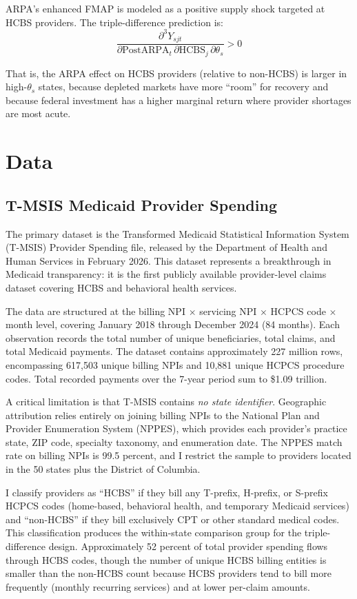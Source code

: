 \documentclass[12pt]{article}
\begin{document}
ARPA's enhanced FMAP is modeled as a positive supply shock targeted at HCBS providers. The triple-difference prediction is:
\begin{equation}
\frac{\partial^3 Y_{sjt}}{\partial \text{PostARPA}_t \, \partial \text{HCBS}_j \, \partial \theta_s} > 0
\end{equation}

That is, the ARPA effect on HCBS providers (relative to non-HCBS) is larger in high-$\theta_s$ states, because depleted markets have more ``room'' for recovery and because federal investment has a higher marginal return where provider shortages are most acute.


\section{Data}

\subsection{T-MSIS Medicaid Provider Spending}

The primary dataset is the Transformed Medicaid Statistical Information System (T-MSIS) Provider Spending file, released by the Department of Health and Human Services in February 2026. This dataset represents a breakthrough in Medicaid transparency: it is the first publicly available provider-level claims dataset covering HCBS and behavioral health services.

The data are structured at the billing NPI $\times$ servicing NPI $\times$ HCPCS code $\times$ month level, covering January 2018 through December 2024 (84 months). Each observation records the total number of unique beneficiaries, total claims, and total Medicaid payments. The dataset contains approximately 227 million rows, encompassing 617,503 unique billing NPIs and 10,881 unique HCPCS procedure codes. Total recorded payments over the 7-year period sum to \$1.09 trillion.

A critical limitation is that T-MSIS contains \emph{no state identifier}. Geographic attribution relies entirely on joining billing NPIs to the National Plan and Provider Enumeration System (NPPES), which provides each provider's practice state, ZIP code, specialty taxonomy, and enumeration date. The NPPES match rate on billing NPIs is 99.5 percent, and I restrict the sample to providers located in the 50 states plus the District of Columbia.

I classify providers as ``HCBS'' if they bill any T-prefix, H-prefix, or S-prefix HCPCS codes (home-based, behavioral health, and temporary Medicaid services) and ``non-HCBS'' if they bill exclusively CPT or other standard medical codes. This classification produces the within-state comparison group for the triple-difference design. Approximately 52 percent of total provider spending flows through HCBS codes, though the number of unique HCBS billing entities is smaller than the non-HCBS count because HCBS providers tend to bill more frequently (monthly recurring services) and at lower per-claim amounts.
\end{document}
